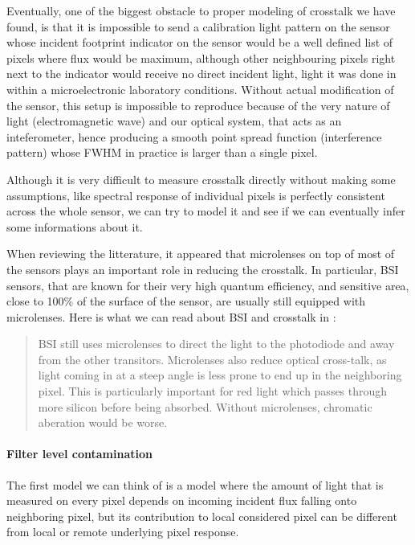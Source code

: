 \documentclass{article}
\begin{document}
    Eventually, one of the biggest obstacle to proper modeling of crosstalk we have found, is that it is impossible to send a calibration light pattern on the sensor whose incident footprint indicator on the sensor would be a well defined list of pixels where flux would be maximum, although other neighbouring pixels right next to the indicator would receive no direct incident light, light it was done in \cite{Estribeau_2005} within a microelectronic laboratory conditions.
    Without actual modification of the sensor, this setup is impossible to reproduce because of the very nature of light (electromagnetic wave) and our optical system, that acts as an inteferometer, hence producing a smooth point spread function (interference pattern) whose FWHM in practice is larger than a single pixel.
    
    Although it is very difficult to measure crosstalk directly without making some assumptions, like spectral response of individual pixels is perfectly consistent across the whole sensor, we can try to model it and see if we can eventually infer some informations about it.

    When reviewing the litterature, it appeared that microlenses on top of most of the sensors plays an important role in reducing the crosstalk. In particular, BSI sensors, that are known for their very high quantum efficiency, and sensitive area, close to 100\% of the surface of the sensor, are usually still equipped with microlenses. Here is what we can read about BSI and crosstalk in \cite{taverni2018front}:
    
    
    \blockquote{BSI still uses microlenses to direct the light to the photodiode and away from the other transitors. Microlenses also reduce optical cross-talk, as light coming in at a steep angle is less prone to end up in the neighboring pixel. This is particularly important for red light which passes through more silicon before being absorbed. Without microlenses, chromatic aberation would be worse.}
    
    

    \paragraph{Filter level contamination}
    The first model we can think of is a model where the amount of light that is measured on every pixel depends on incoming incident flux falling onto neighboring pixel, but its contribution to local considered pixel can be different from local or remote underlying pixel response.
    
\end{document}
